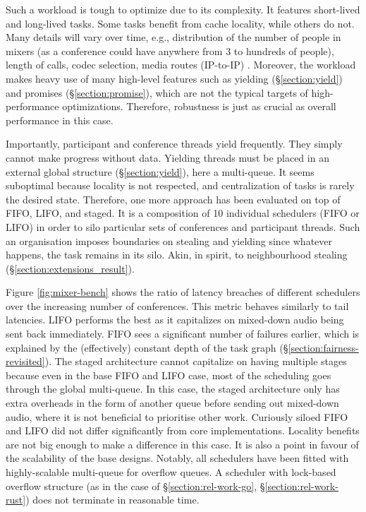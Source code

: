\documentclass[12pt,a4paper,twoside]{report}
\begin{document}
Such a workload is tough to optimize due to its complexity. It features short-lived and long-lived tasks. Some tasks benefit from cache locality, while others do not. Many details will vary over time, e.g., distribution of the number of people in mixers (as a conference could have anywhere from 3 to hundreds of people), length of calls, codec selection, media routes (IP-to-IP) \cite{Frequent1:online}. Moreover, the workload makes heavy use of many high-level features such as yielding (\S\ref{section:yield}) and promises (\S\ref{section:promise}), which are not the typical targets of high-performance optimizations. Therefore, robustness is just as crucial as overall performance in this case. 
 
Importantly, participant and conference threads yield frequently. They simply cannot make progress without data. Yielding threads must be placed in an external global structure (\S\ref{section:yield}), here a multi-queue. It seems suboptimal because locality is not respected, and centralization of tasks is rarely the desired state. Therefore, one more approach has been evaluated on top of FIFO, LIFO, and staged. It is a composition of 10 individual schedulers (FIFO or LIFO) in order to silo particular sets of conferences and participant threads. Such an organisation imposes boundaries on stealing and yielding since whatever happens, the task remains in its silo. Akin, in spirit, to neighbourhood stealing (\S\ref{section:extensions_result}).

\label{paragraph:overflow-queue-bad-2}

Figure \ref{fig:mixer-bench} shows the ratio of latency breaches of different schedulers over the increasing number of conferences. This metric behaves similarly to tail latencies. LIFO performs the best as it capitalizes on mixed-down audio being sent back immediately. FIFO sees a significant number of failures earlier, which is explained by the (effectively) constant depth of the task graph (\S\ref{section:fairness-revisited}). The staged architecture cannot capitalize on having multiple stages because even in the base FIFO and LIFO case, most of the scheduling goes through the global multi-queue. In this case, the staged architecture only has extra overheads in the form of another queue before sending out mixed-down audio, where it is not beneficial to prioritise other work. Curiously siloed FIFO and LIFO did not differ significantly from core implementations. Locality benefits are not big enough to make a difference in this case. It is also a point in favour of the scalability of the base designs. Notably, all schedulers have been fitted with highly-scalable multi-queue for overflow queues. A scheduler with lock-based overflow structure (as in the case of \S\ref{section:rel-work-go}, \S\ref{section:rel-work-rust}) does not terminate in reasonable time.
\end{document}
